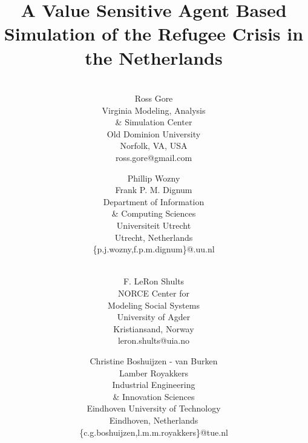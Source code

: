 \documentclass{scspaperproc}
\theoremstyle{scsthe}
\begin{document}
\title{A Value Sensitive Agent Based Simulation of the Refugee Crisis in the Netherlands}

\author{
\\%
Ross Gore \\ [12pt]
Virginia Modeling, Analysis \\ \& Simulation Center \\
Old Dominion University \\
Norfolk, VA, USA \\
ross.gore@gmail.com\\
\and
Phillip Wozny \\
Frank P. M. Dignum \\ [12pt]
Department of Information \\ \& Computing Sciences \\
Universiteit Utrecht \\
Utrecht, Netherlands \\
\{p.j.wozny,f.p.m.dignum\}@.uu.nl \\
\and
\\%
F. LeRon Shults \\ [12pt]
NORCE Center for \\ Modeling Social Systems \\
University of Agder \\
Kristiansand, Norway \\
leron.shults@uia.no \\
\and
Christine Boshuijzen - van Burken \\ 
Lamber Royakkers \\ [12pt]
Industrial Engineering \\ \& Innovation Sciences \\
Eindhoven University of Technology \\
Eindhoven, Netherlands \\
\{c.g.boshuijzen,l.m.m.royakkers\}@tue.nl
}
\end{document}
